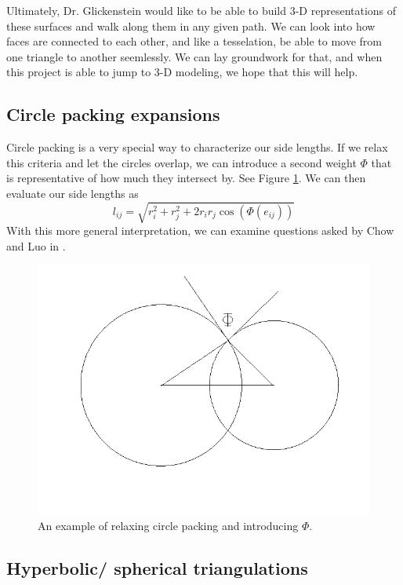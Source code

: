 \documentclass[12pt]{article}
\begin{document}
\noindent Ultimately, Dr. Glickenstein would like to be able to build 3-D representations of these surfaces and walk along them in any given path. We can look into how faces are connected to each other, and like a tesselation, be able to move from one triangle to another seemlessly. We can lay groundwork for that, and when this project is able to jump to 3-D modeling, we hope that this will help.  

\subsection{Circle packing expansions}
\label{circExt}
Circle packing is a very special way to characterize our side lengths. If we relax this criteria and let the circles overlap, we can introduce a second weight $\Phi$ that is representative of how much they intersect by. See Figure \ref{fig:intcirc}. We can then evaluate our side lengths as $$l_{ij} = \sqrt{r_i^2 + r_j^2 + 2r_ir_j\cos(\Phi(e_{ij}))}$$ With this more general interpretation, we can examine questions asked by Chow and Luo in \cite{chowluo}.  

\begin{figure}
\begin{center}
\includegraphics[scale = 0.6]{intcirc.png}
\end{center}
\caption{An example of relaxing circle packing and introducing $\Phi.$}
\label{fig:intcirc}
\end{figure}

\subsection{Hyperbolic/ spherical triangulations}
\end{document}
